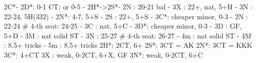2C*- 
2D*: 0-1 CT; or 0-5
   - 2H*->2S*- 2N : 20-21 bal
             - 3X : 22+, nat, 5+H
             - 3N : 22-24, 5H(332)
        - 2N*: 4-7, 5+S
   - 2S : 22+, 5+S
        - 3C*: cheaper minor, 0-3
   - 2N : 22-24  # 4-th seat: 24-25
   - 3C : nat, 5+C
        - 3D*: cheaper minor, 0-3
   - 3D : GF, 5+D
   - 3M : nat solid ST
   - 3N : 25-27  # 4-th seat: 26-27
   - 4m : nat solid ST
   - 4M : 8.5+ tricks
   - 5m : 8.5+ tricks
2H*: 2CT, 6+
2S*: 3CT = AK
2N*: 3CT = KKK
3C*: 4+CT
3X : weak, 0-2CT, 6+X, GF
3N*: weak, 0-2CT, 6+C
